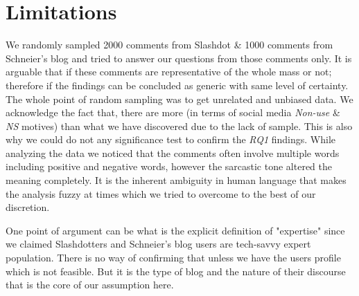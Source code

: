 \section{Limitations}
\label{sec:limitations}
We randomly sampled 2000 comments from Slashdot \& 1000 comments from Schneier's blog and tried to answer our questions from those comments only. It is arguable that if these comments are representative of the whole mass or not; therefore if the findings can be concluded as generic with same level of certainty. The whole point of random sampling was to get unrelated and unbiased data. We acknowledge the fact that, there are more (in terms of social media \emph{Non-use} \& \emph{NS} motives) than what we have discovered due to the lack of sample. This is also why we could do not any significance test to confirm the \textit{RQ1} findings. While analyzing the data we noticed that the comments often involve multiple words including positive and negative words, however the sarcastic tone altered the meaning completely. It is the inherent ambiguity in human language that makes the analysis fuzzy at times which we tried to overcome to the best of our discretion.

One point of argument can be what is the explicit definition of "expertise" since we claimed Slashdotters and Schneier's blog users are tech-savvy expert population. There is no way of confirming that unless we have the users profile which is not feasible. But it is the type of blog and the nature of their discourse that is the core of our assumption here. 
